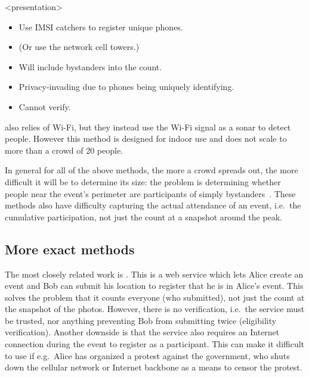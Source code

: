 \begin{frame}<presentation>
  \begin{solution}
    \begin{itemize}
      \item Use IMSI catchers to register unique phones.
      \item (Or use the network cell towers.)
    \end{itemize}
  \end{solution}

  \pause

  \begin{remark}
    \begin{itemize}
      \item Will include bystanders into the count.
      \item Privacy-invading due to phones being uniquely identifying.
      \item Cannot verify.
    \end{itemize}
  \end{remark}
\end{frame}

\Textcite{WifiCrowdCounting} also relies of Wi-Fi, but they instead use the 
Wi-Fi signal as a sonar to detect people.
However this method is designed for indoor use and does not scale to more than 
a crowd of 20 people.

In general for all of the above methods, the more a crowd spreads out, the more
difficult it will be to determine its size:
the problem is determining whether people near the event's perimeter are 
participants of simply bystanders~\cite{HowToEstimateCrowdSize}.
These methods also have difficulty capturing the actual attendance of an event,
i.e.\ the cumulative participation, not just the count at a snapshot around the 
peak.

\subsection<presentation>{More exact methods}

The most closely related work is \textcite{CrowdCount}.
This is a web service which lets Alice create an event and Bob can submit his 
location to register that he is in Alice's event.
This solves the problem that it counts everyone (who submitted), not just the 
count at the snapshot of the photos.
However, there is no verification, i.e.\ the service must be trusted, nor 
anything preventing Bob from submitting twice (eligibility verification).
Another downside is that the service also requires an Internet connection 
during the event to register as a participant.
This can make it difficult to use if e.g.\ Alice has organized a protest 
against the government, who shuts down the cellular network or Internet 
backbone as a means to censor the protest.

